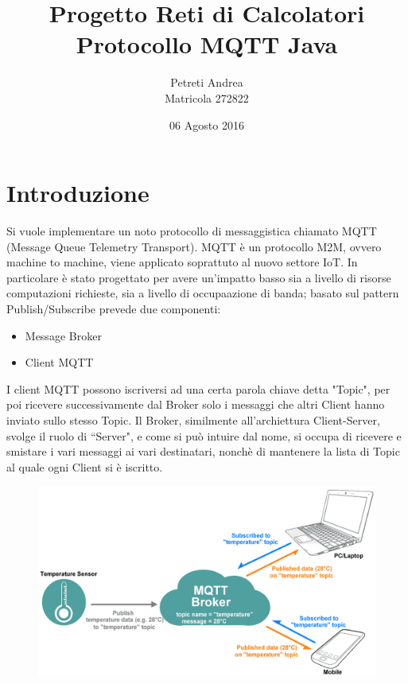 \documentclass{article}
\title{Progetto Reti di Calcolatori \\[5em] 
\large Protocollo MQTT Java}
\author{Petreti Andrea\\\small Matricola 272822}
\date{06 Agosto 2016}
\begin{document}
\maketitle
\thispagestyle{empty}

\newpage 

\renewcommand{\contentsname}{Indice}

\tableofcontents

\newpage

\section{Introduzione}
Si vuole implementare un noto protocollo di messaggistica chiamato MQTT (Message Queue Telemetry Transport). MQTT è un protocollo M2M, ovvero machine to machine, viene applicato soprattuto al nuovo settore IoT. In particolare è stato progettato per avere un'impatto basso sia a livello di risorse computazioni richieste, sia a livello di occupaazione di banda; basato sul pattern Publish/Subscribe prevede due componenti:
\begin{itemize}
	\item Message Broker
	\item Client MQTT
\end{itemize}
I client MQTT possono iscriversi ad una certa parola chiave detta "Topic", per poi ricevere successivamente dal Broker solo i messaggi che altri Client hanno inviato sullo stesso Topic. Il Broker, similmente all'archiettura Client-Server, svolge il ruolo di ``Server", e come si può intuire dal nome, si occupa di ricevere e smistare i vari messaggi ai vari destinatari, nonchè di mantenere la lista di Topic al quale ogni Client si è iscritto.

\begin{figure}[htbp]
	\centerline{
		\includegraphics[scale=0.2]{immagini/broker_client_img.png}
	}
\end{figure}
\end{document}
